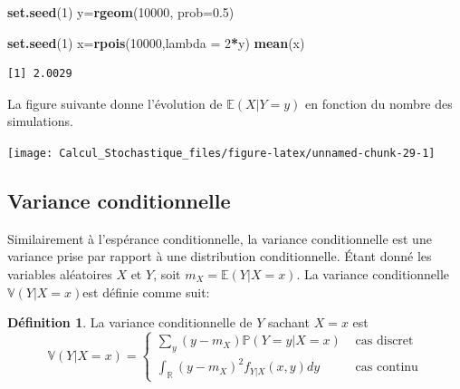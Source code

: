 \documentclass[
]{book}
\newenvironment{Shaded}{\begin{snugshade}}{\end{snugshade}}
\newcommand{\DataTypeTok}[1]{\textcolor[rgb]{0.13,0.29,0.53}{#1}}
\newcommand{\DecValTok}[1]{\textcolor[rgb]{0.00,0.00,0.81}{#1}}
\newcommand{\FloatTok}[1]{\textcolor[rgb]{0.00,0.00,0.81}{#1}}
\newcommand{\KeywordTok}[1]{\textcolor[rgb]{0.13,0.29,0.53}{\textbf{#1}}}
\newcommand{\NormalTok}[1]{#1}
\newcommand{\OperatorTok}[1]{\textcolor[rgb]{0.81,0.36,0.00}{\textbf{#1}}}
\theoremstyle{definition}
\newtheorem{definition}{Définition}[chapter]
\theoremstyle{definition}
\theoremstyle{definition}
\theoremstyle{remark}
\begin{document}
\begin{Shaded}
\begin{Highlighting}[]
\KeywordTok{set.seed}\NormalTok{(}\DecValTok{1}\NormalTok{)}
\NormalTok{y=}\KeywordTok{rgeom}\NormalTok{(}\DecValTok{10000}\NormalTok{, }\DataTypeTok{prob=}\FloatTok{0.5}\NormalTok{)}
\end{Highlighting}
\end{Shaded}

\begin{Shaded}
\begin{Highlighting}[]
\KeywordTok{set.seed}\NormalTok{(}\DecValTok{1}\NormalTok{)}
\NormalTok{x=}\KeywordTok{rpois}\NormalTok{(}\DecValTok{10000}\NormalTok{,}\DataTypeTok{lambda =} \DecValTok{2}\OperatorTok{*}\NormalTok{y)}
\KeywordTok{mean}\NormalTok{(x)}
\end{Highlighting}
\end{Shaded}

\begin{verbatim}
[1] 2.0029
\end{verbatim}

La figure suivante donne l'évolution de \(\mathbb{E}\left(X|Y=y\right)\) en fonction du nombre des simulations.

\begin{center}\texttt{[image: Calcul\_Stochastique\_files/figure-latex/unnamed-chunk-29-1]} \end{center}

\hypertarget{variance-conditionnelle}{%
\subsection{Variance conditionnelle}\label{variance-conditionnelle}}

Similairement à l'espérance conditionnelle, la variance conditionnelle est une variance prise par rapport à une distribution conditionnelle. Étant donné les variables aléatoires \(X\) et \(Y\), soit \(m_X=\mathbb{E}\left(Y|X=x \right)\). La variance conditionnelle \(\mathbb{V}(Y | X = x)\)est définie comme suit:

\begin{definition}
\protect\hypertarget{def:unnamed-chunk-30}{}{\label{def:unnamed-chunk-30} }La variance conditionnelle de \(Y\) sachant \(X=x\) est
\[
\mathbb{V}\left(Y|X=x \right)=\left\{
\begin{array}{ll}
\displaystyle \sum_y (y-m_X)\mathbb{P}\left(Y=y|X=x \right) & \text{ cas discret}\\
\displaystyle \int_{\mathbb{R}}(y-m_X)^2f_{Y|X}(x,y)dy & \text{ cas continu}
\end{array}
\right.
\]
\end{definition}
\end{document}
